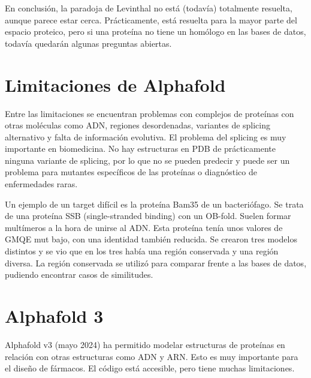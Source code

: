 En conclusión, la paradoja de Levinthal no está (todavía) totalmente resuelta, aunque parece estar cerca. Prácticamente, está resuelta para la mayor parte del espacio proteico, pero si una proteína no tiene un homólogo en las bases de datos, todavía quedarán algunas preguntas abiertas.

\section{Limitaciones de Alphafold}
Entre las limitaciones se encuentran problemas con complejos de proteínas con otras moléculas como ADN, regiones desordenadas, variantes de splicing alternativo y falta de información evolutiva. El problema del splicing es muy importante en biomedicina. No hay estructuras en PDB de prácticamente ninguna variante de splicing, por lo que no se pueden predecir y puede ser un problema para mutantes específicos de las proteínas o diagnóstico de enfermedades raras. 

Un ejemplo de un target difícil es la proteína Bam35 de un bacteriófago. Se trata de una proteína SSB (single-stranded binding) con un OB-fold. Suelen formar multímeros a la hora de unirse al ADN. Esta proteína tenía unos valores de GMQE mut bajo, con una identidad también reducida. Se crearon tres modelos distintos y se vio que en los tres había una región conservada y una región diversa. La región conservada se utilizó para comparar frente a las bases de datos, pudiendo encontrar casos de similitudes. 

\section{Alphafold 3}
Alphafold v3 (mayo 2024) ha permitido modelar estructuras de proteínas en relación con otras estructuras como ADN y ARN. Esto es muy importante para el diseño de fármacos. El código está accesible, pero tiene muchas limitaciones. 
